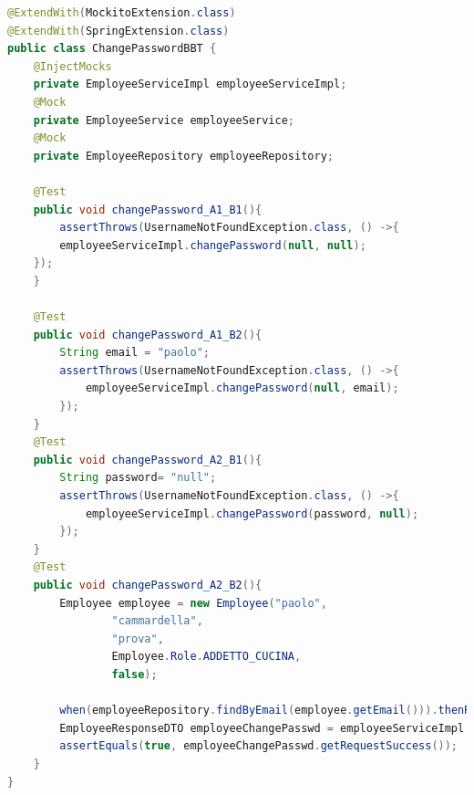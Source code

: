 \begin{lstlisting}[language=java]
@ExtendWith(MockitoExtension.class)
@ExtendWith(SpringExtension.class)
public class ChangePasswordBBT {
    @InjectMocks
    private EmployeeServiceImpl employeeServiceImpl;
    @Mock
    private EmployeeService employeeService;
    @Mock
    private EmployeeRepository employeeRepository;

    @Test
    public void changePassword_A1_B1(){
        assertThrows(UsernameNotFoundException.class, () ->{
        employeeServiceImpl.changePassword(null, null);
    });
    }

    @Test
    public void changePassword_A1_B2(){
        String email = "paolo";
        assertThrows(UsernameNotFoundException.class, () ->{
            employeeServiceImpl.changePassword(null, email);
        });
    }
    @Test
    public void changePassword_A2_B1(){
        String password= "null";
        assertThrows(UsernameNotFoundException.class, () ->{
            employeeServiceImpl.changePassword(password, null);
        });
    }
    @Test
    public void changePassword_A2_B2(){
        Employee employee = new Employee("paolo",
                "cammardella",
                "prova",
                Employee.Role.ADDETTO_CUCINA,
                false);

        when(employeeRepository.findByEmail(employee.getEmail())).thenReturn(employee);
        EmployeeResponseDTO employeeChangePasswd = employeeServiceImpl.changePassword(employee.getPassword(), employee.getEmail());
        assertEquals(true, employeeChangePasswd.getRequestSuccess());
    }
}
\end{lstlisting}
